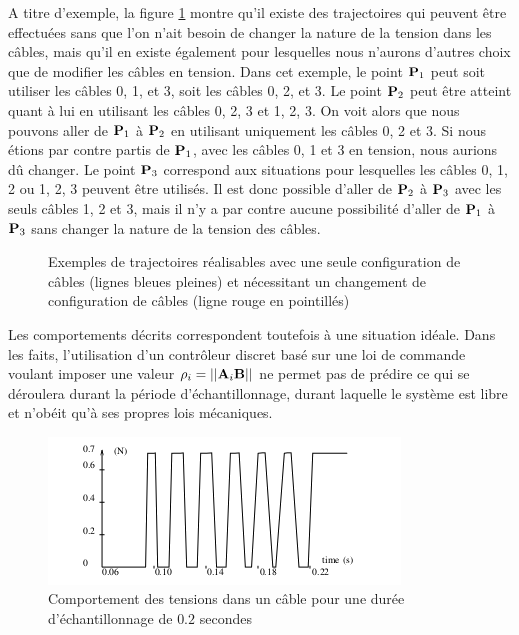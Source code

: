 A titre d'exemple, la figure \ref{chap03:fig000} montre qu'il existe des 
trajectoires qui peuvent être effectuées sans que l'on n'ait besoin de changer 
la nature de la tension dans les câbles, mais qu'il en existe également pour 
lesquelles nous n'aurons d'autres choix que de modifier les câbles en tension. 
Dans cet exemple, le point ${\bf P}_1$ peut soit utiliser les câbles 0, 1, et 3, 
soit les câbles 0, 2, et 3. Le point ${\bf P}_2$ peut être atteint quant à lui 
en utilisant les câbles 0, 2, 3 et 1, 2, 3. On voit alors que nous pouvons 
aller de ${\bf P}_1$ à ${\bf P}_2$ en utilisant uniquement les câbles 0, 2 et 3. 
Si nous étions par contre partis de ${\bf P}_1$, avec les câbles 0, 1 et 3 en 
tension, nous aurions d\^u changer. Le point ${\bf P}_3$ correspond aux 
situations pour lesquelles les câbles 0, 1, 2 ou 1, 2, 3 peuvent être utilisés. 
Il est donc possible d'aller de ${\bf P}_2$ à ${\bf P}_3$ avec les seuls câbles 
1, 2 et 3, mais il n'y a par contre aucune possibilité d'aller de ${\bf P}_1$ à 
${\bf P}_3$ sans changer la nature de la tension des câbles.


\begin{figure}[!ht]
  \centering
    \def\svgwidth{.65\linewidth}
  
    \caption{\footnotesize{Exemples de trajectoires réalisables avec une seule 
configuration de câbles (lignes bleues pleines) et nécessitant un changement de 
configuration de câbles (ligne rouge en pointillés)}}
\label{chap03:fig000}
\end{figure}

Les comportements décrits correspondent toutefois à une situation idéale. Dans 
les faits, l'utilisation d'un contrôleur discret basé sur une loi de commande 
voulant imposer une valeur $\rho_i = ||{\bf A}_i{\bf B}||$ ne permet pas de 
prédire ce qui se déroulera durant la période d'échantillonnage, durant laquelle 
le système est libre et n'obéit qu'à ses propres lois mécaniques.

\begin{figure}[!htp]
  \centering
    \includegraphics[width=.75\linewidth]{./chapter03/figures/controleur_discret.png}
    \caption{\footnotesize Comportement des tensions dans un câble pour une 
durée d'échantillonnage de $0.2$ secondes}
\label{chap03:fig00}
\end{figure}

